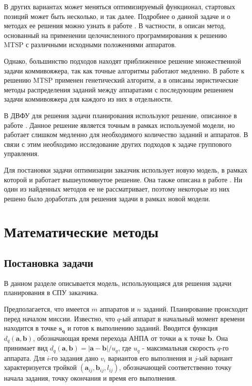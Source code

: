\documentclass[a4paper,14pt,russian]{article}
\begin{document}
В других вариантах может меняться оптимизируемый функционал, стартовых позиций может быть несколько, и так далее. Подробнее о данной задаче и о методах ее решения можно узнать в работе \cite{bektas2006multiple}.
В частности, в \cite{binaryprog} описан метод, основанный на применении целочисленного программирования к решению MTSP с различными исходными положениями аппаратов.

Однако, большинство подходов находят приближенное решение множественной задачи коммивояжера, так как точные алгоритмы работают медленно. В работе \cite{kiraly2010novel} к решению MTSP применен генетический алгоритм, а в \cite{na2007heurisic} описаны эвристические методы распределения заданий между аппаратами с последующим решением задачи коммивояжера для каждого из них в отдельности.

В ДВФУ для решения задачи планирования используют решение, описанное в работе \cite{tuphanov1}. Данное решение является точным в рамках используемой модели, но работает слишком медленно для необходимого количество заданий и аппаратов. В связи с этим необходимо исследование других подходов к задаче группового управления.

Для постановки задачи оптимизации заказчик использует новую модель, в рамках которой и работает вышеупомянутое решение. Она также описана в работе \cite{tuphanov1}. Ни один из найденных методов ее не рассматривает, поэтому некоторые из них решено было доработать для решения задачи в рамках новой модели.

\section{Математические методы}

\subsection{Постановка задачи}
В данном разделе описывается модель, использующаяся для решения задачи планирования в СПУ заказчика.

Предполагается, что имеется $m$ аппаратов и $n$ заданий. Планирование происходит перед началом миссии. Известно, что $q$-ый аппарат в начальный момент времени находится в точке $\mathbf{s_q}$ и готов к выполнению заданий. Вводится функция $d_q(\mathbf{a}, \mathbf{b})$, обозначающая время перехода АНПА от точки $\mathbf{a}$ к точке $\mathbf{b}$. Она принимает вид $d_q(\mathbf{a}, \mathbf{b}) = |\mathbf{a} - \mathbf{b}| / u_q$, где $u_q$ - максимальная скорость $q$-го аппарата. Для $i$-го задания дано $v_i$ вариантов его выполнения и $j$-ый вариант характеризуется тройкой $(\mathbf{a}_{i  j}, \mathbf{b}_{i j}, l_{i j})$, обозначающей соответственно точку начала задания, точку окончания и время его выполнения.
\end{document}
